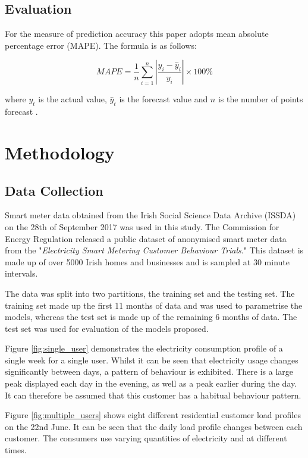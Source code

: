 \subsection{Evaluation}

For the measure of prediction accuracy this paper adopts mean absolute percentage error (MAPE). The formula is as follows:

\begin{equation}
MAPE=\frac{1}{n}\sum_{i=1}^n\left|\frac{y_i-\hat{y}_i}{y_i}\right|\times 100\%
\end{equation}

where $y_t$ is the actual value, $\hat{y}_t$ is the forecast value and $n$ is the number of points forecast \cite{Li2016}.


\section{Methodology}

\subsection{Data Collection}

Smart meter data obtained from the Irish Social Science Data Archive (ISSDA) on the 28th of September 2017 was used in this study. The Commission for Energy Regulation released a public dataset of anonymised smart meter data from the "\textit{Electricity Smart Metering Customer Behaviour Trials}." This dataset is made up of over 5000 Irish homes and businesses and is sampled at 30 minute intervals.

The data was split into two partitions, the training set and the testing set. The training set made up the first 11 months of data and was used to parametrise the models, whereas the test set is made up of the remaining 6 months of data. The test set was used for evaluation of the models proposed.

Figure \ref{fig:single_user} demonstrates the electricity consumption profile of a single week for a single user. Whilst it can be seen that electricity usage changes significantly between days, a pattern of behaviour is exhibited. There is a large peak displayed each day in the evening, as well as a peak earlier during the day. It can therefore be assumed that this customer has a habitual behaviour pattern. 

Figure \ref{fig:multiple_users} shows eight different residential customer load profiles on the 22nd June. It can be seen that the daily load profile changes between each customer. The consumers use varying quantities of electricity and at different times. 


